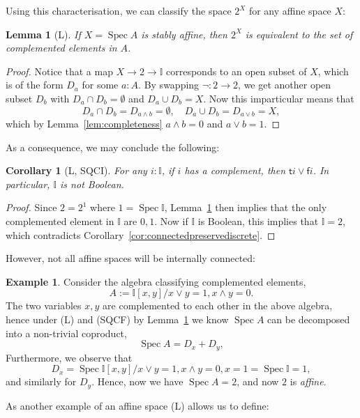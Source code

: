 \documentclass[12pt]{amsart}
\newtheorem{lemma}[theorem]{Lemma}
\newtheorem{corollary}[theorem]{Corollary}
\theoremstyle{definition}
\newtheorem{example}[theorem]{Example}
\newcommand{\mbb}[1]{\mathbb{#1}}
\newcommand{\I}{\mbb I}
\newcommand{\ms}[1]{\mathsf{#1}}
\newcommand{\emp}{\emptyset}
\newcommand{\spec}{\operatorname{Spec}}
\begin{document}
Using this characterisation, we can classify the space $2^X$ for any affine space $X$:

\begin{lemma}[L]\label{lem:decompcomplement}
  If $X = \spec A$ is stably affine, then $2^X$ is equivalent to the set of complemented elements in $A$.
\end{lemma}
\begin{proof}
  Notice that a map $X \to 2 \to \I$ corresponds to an open subset of $X$, which is of the form $D_a$ for some $a:A$. By swapping $\neg : 2 \to 2$, we get another open subset $D_b$ with $D_a \cap D_b = \emp$ and $D_a \cup D_b = X$. Now this imparticular means that
  \[ D_a \cap D_b = D_{a \wedge b} = \emp, \quad D_a \cup D_b = D_{a\vee b} = X, \]
  which by Lemma~\ref{lem:completeness} $a \wedge b = 0$ and $a \vee b = 1$. 
\end{proof}

As a consequence, we may conclude the following:

\begin{corollary}[L, SQCI]
  For any $i : \I$, if $i$ has a complement, then $\ms ti \vee \ms fi$. In particular, $\I$ is not Boolean.
\end{corollary}
\begin{proof}
  Since $2 = 2^1$ where $1 = \spec \I$, Lemma~\ref{lem:decompcomplement} then implies that the only complemented element in $\I$ are $0,1$. Now if $\I$ is Boolean, this implies that $\I = 2$, which contradicts Corollary~\ref{cor:connectedpreservediscrete}.
\end{proof}

However, not all affine spaces will be internally connected:

\begin{example}
  Consider the algebra classifying complemented elements,
  \[ A := \I[x,y]/x\vee y = 1,x \wedge y = 0. \]
  The two variables $x,y$ are complemented to each other in the above algebra, hence under (L) and (SQCF) by Lemma~\ref{lem:decompcomplement} we know $\spec A$ can be decomposed into a non-trivial coproduct,
  \[ \spec A = D_x + D_y, \]
  Furthermore, we observe that 
  \[ D_x = \spec \I[x,y]/x \vee y = 1,x \wedge y = 0,x =1 = \spec \I = 1, \]
  and similarly for $D_y$. Hence, now we have $\spec A = 2$, and now $2$ is \emph{affine}.
\end{example}

As another example of an affine space (L) allows us to define:
\end{document}
